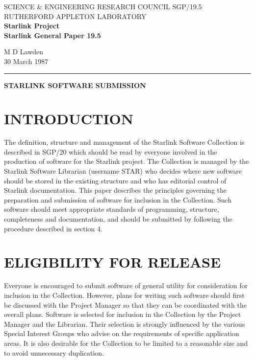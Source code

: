 \setlength{\textwidth}{153mm}
\setlength{\textheight}{220mm}
\setlength{\oddsidemargin}{3mm}
\setlength{\evensidemargin}{3mm}
\pagestyle{myheadings}


\thispagestyle{plain}
\noindent
SCIENCE \& ENGINEERING RESEARCH COUNCIL \hfill SGP/19.5\\
RUTHERFORD APPLETON LABORATORY\\
{\large\bf Starlink Project\\}
{\large\bf Starlink General Paper 19.5}
\begin{flushright}
M D Lawden\\
30 March 1987
\end{flushright}
\vspace{-4mm}
\rule{\textwidth}{0.5mm}
\vspace{10mm}
\begin{center}
{\Large \bf
STARLINK SOFTWARE SUBMISSION}
\end{center}
\vspace{10mm}
\section {INTRODUCTION}
The definition, structure and management of the Starlink Software Collection is
described in SGP/20 which should be read by everyone involved in the
production of software for the Starlink project.
The Collection is managed by the Starlink Software Librarian (username STAR) who
decides where new software should be stored in the existing structure and who
has editorial control of Starlink documentation.
This paper describes the principles governing the preparation and submission of
software for inclusion in the Collection.
Such software should meet appropriate standards of programming, structure,
completeness and documentation, and should be submitted by following the
procedure described in section 4.
\section {ELIGIBILITY FOR RELEASE}
Everyone is encouraged to submit software of general utility for consideration
for inclusion in the Collection.
However, plans for writing such software should first be discussed with the
Project Manager so that they can be coordinated with the overall plans.
Software is selected for inclusion in the Collection by the Project Manager and
the Librarian.
Their selection is strongly influenced by the various Special Interest Groups
who advise on the requirements of specific application areas.
It is also desirable for the Collection to be limited to a reasonable size and
to avoid unnecessary duplication.
